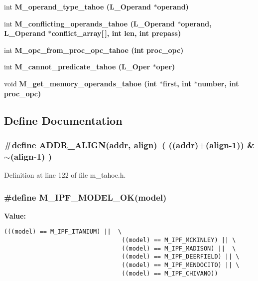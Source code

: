 \begin{CompactItemize}
\item 
int \bf{M\_\-operand\_\-type\_\-tahoe} (L\_\-Operand $\ast$operand)
\item 
int \bf{M\_\-conflicting\_\-operands\_\-tahoe} (L\_\-Operand $\ast$operand, L\_\-Operand $\ast$conflict\_\-array[$\,$], int len, int prepass)
\item 
int \bf{M\_\-opc\_\-from\_\-proc\_\-opc\_\-tahoe} (int proc\_\-opc)
\item 
int \bf{M\_\-cannot\_\-predicate\_\-tahoe} (L\_\-Oper $\ast$oper)
\item 
void \bf{M\_\-get\_\-memory\_\-operands\_\-tahoe} (int $\ast$first, int $\ast$number, int proc\_\-opc)
\end{CompactItemize}


\subsection{Define Documentation}
\subsubsection{\setlength{\rightskip}{0pt plus 5cm}\#define ADDR\_\-ALIGN(addr, align)~( ((addr)+(align-1)) \& $\sim$(align-1) )}\label{m__tahoe_8h_6d086102bb3c719ca1cff92d03dccb3a}




Definition at line 122 of file m\_\-tahoe.h.
\subsubsection{\setlength{\rightskip}{0pt plus 5cm}\#define M\_\-IPF\_\-MODEL\_\-OK(model)}\label{m__tahoe_8h_72bb2019acbbd352f3a23e4a68004119}


\textbf{Value:}

\begin{Code}\begin{verbatim}(((model) == M_IPF_ITANIUM) ||  \
                                 ((model) == M_IPF_MCKINLEY) || \
                                 ((model) == M_IPF_MADISON) ||  \
                                 ((model) == M_IPF_DEERFIELD) || \
                                 ((model) == M_IPF_MENDOCITO) || \
                                 ((model) == M_IPF_CHIVANO))
\end{verbatim}\end{Code}


